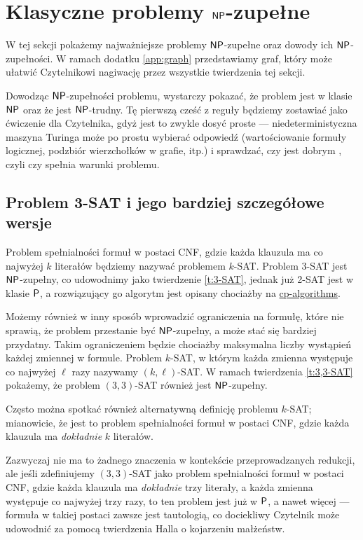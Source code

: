 \section{Klasyczne problemy $\textsf{NP}$-zupełne}

W tej sekcji pokażemy najważniejsze problemy $\textsf{NP}$-zupełne oraz dowody ich $\textsf{NP}$-zupełności. W ramach dodatku \ref{app:graph} przedstawiamy graf, który może ułatwić Czytelnikowi nagiwację przez wszystkie twierdzenia tej sekcji.

Dowodząc $\textsf{NP}$-zupełności problemu, wystarczy pokazać, że problem jest w klasie $\textsf{NP}$ oraz że jest $\textsf{NP}$-trudny. Tę pierwszą cześć z reguły będziemy zostawiać jako ćwiczenie dla Czytelnika, gdyż jest to zwykle dosyć proste --- niedeterministyczna maszyna Turinga może po prostu wybierać odpowiedź (wartościowanie formuły logicznej, podzbiór wierzchołków w grafie, itp.) i sprawdzać, czy jest dobrym , czyli czy spełnia warunki problemu.

\subsection{Problem 3-SAT i jego bardziej szczegółowe wersje}

Problem spełnialności formuł w postaci CNF, gdzie każda klauzula ma co najwyżej $k$ literałów będziemy nazywać problemem $k$-SAT. Problem 3-SAT jest $\textsf{NP}$-zupełny, co udowodnimy jako twierdzenie \ref{t:3-SAT}, jednak już 2-SAT jest w klasie $\textsf{P}$, a rozwiązujący go algorytm jest opisany chociażby na \href{https://cp-algorithms.com/graph/2SAT.html}{cp-algorithms}.

Możemy również w inny sposób wprowadzić ograniczenia na formułę, które nie sprawią, że problem przestanie być $\textsf{NP}$-zupełny, a może stać się bardziej przydatny.
Takim ograniczeniem będzie chociażby maksymalna liczby wystąpień każdej zmiennej w formule. Problem $k$-SAT, w którym każda zmienna występuje co najwyżej $\ell$ razy nazywamy $(k, \ell)$-SAT. W ramach twierdzenia \ref{t:3,3-SAT} pokażemy, że problem $(3, 3)$-SAT również jest $\textsf{NP}$-zupełny.

\begin{remark}
    Często można spotkać również alternatywną definicję problemu $k$-SAT; mianowicie, że jest to problem spełnialności formuł w postaci CNF, gdzie każda klauzula ma \emph{dokładnie} $k$ literałów.

    Zazwyczaj nie ma to żadnego znaczenia w kontekście przeprowadzanych redukcji, ale jeśli zdefiniujemy $(3, 3)$-SAT jako problem spełnialności formuł w postaci CNF, gdzie każda klauzula ma \emph{dokładnie} trzy literały, a każda zmienna występuje co najwyżej trzy razy, to ten problem jest już w $\textsf{P}$, a nawet więcej --- formuła w takiej postaci zawsze jest tautologią, co dociekliwy Czytelnik może udowodnić za pomocą twierdzenia Halla o kojarzeniu małżeństw.
\end{remark}

